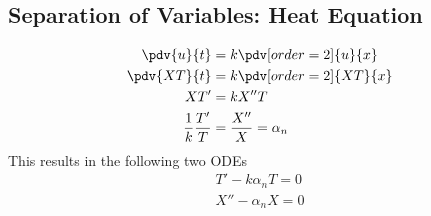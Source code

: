 \documentclass{article}
\begin{document}
\subsection{Separation of Variables: Heat Equation}
\begin{align*}
    \pdv{u}{t}               & = k\pdv[order=2]{u}{x}     \\
    \pdv{XT}{t}              & = k\pdv[order=2]{XT}{x}    \\
    XT'                      & = kX''T                    \\
    \frac{1}{k} \frac{T'}{T} & = \frac{X''}{X} = \alpha_n
\end{align*}
This results in the following two ODEs
\begin{align*}
    T' - k \alpha_n T = 0 \\
    X'' - \alpha_n X = 0
\end{align*}
\end{document}
